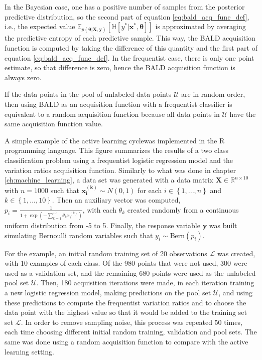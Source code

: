 In the Bayesian case, one has a positive number of samples from the posterior predictive distribution, so the second part of equation \eqref{eq:bald_acq_func_def}, i.e., the expected value
$\mathbb{E}_{p(\boldsymbol{\theta} | \boldsymbol{X}, \boldsymbol{y})} \left[ \mathbb{H} \left[ y^* | \boldsymbol{x}^*, \boldsymbol{\theta} \right] \right]$
is approximated by averaging the predictive entropy of each predictive sample. This way, the BALD acquisition function is computed by taking the difference of this quantity and the first part of equation \eqref{eq:bald_acq_func_def}.
In the frequentist case, there is only one point estimate, so that difference is zero, hence the BALD acquisition function is always zero.

If the data points in the pool of unlabeled data points $\mathcal{U}$ are in random order, then using BALD as an acquisition function with a frequentist classifier is equivalent to a random acquisition function because all data points in $\mathcal{U}$ have the same acquisition function value.

A simple example of the active learning cyclewas implemented in the R programming language. This figure summarizes the results of a two class classification problem using a frequentist logistic regression model and the variation ratios acquisition function. Similarly to what was done in chapter \ref{ch:machine_learning}, a data set was generated with a data matrix $\boldsymbol{X} \in \mathbb{R}^{n \times 10}$ with $n = 1000$ such that $\boldsymbol{x_i^{(k)}} \sim N(0, 1)$ for each $i \in \left\{1, ..., n \right\}$ and $k \in \left\{1, ..., 10 \right\}$.
Then an auxiliary vector was computed, $p_i = \frac{1}{1 + \exp \left( - \sum_{k = 1}^{10} \theta_k x_i^{(k)}  \right)}$, with each $\theta_k$ created randomly from a continuous uniform distribution from -5 to 5. Finally, the response variable $\boldsymbol{y}$ was built simulating Bernoulli random variables such that $y_i \sim \mathrm{Bern}(p_i)$.

For the example, an initial random training set of 20 observations $\mathcal{L}$ was created, with 10 examples of each class. Of the 980 points that were not used, 300 were used as a validation set, and the remaining 680 points were used as the unlabeled pool set $\mathcal{U}$.
Then, 180 acquisition iterations were made, in each iteration training a new logistic regression model, making predictions on the pool set $\mathcal{U}$, and using these predictions to compute the frequentist variation ratios and to choose the data point with the highest value so that it would be added to the training set set $\mathcal{L}$. In order to remove sampling noise, this process was repeated 50 times, each time choosing different initial random training, validation and pool sets. The same was done using a random acquisition function to compare with the active learning setting.

